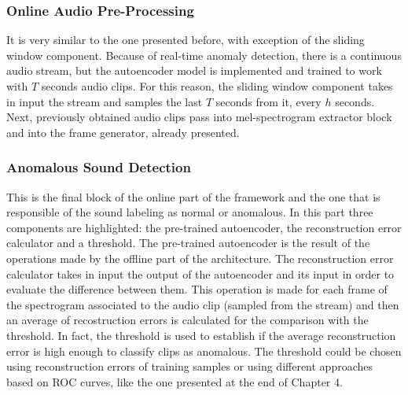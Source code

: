 \subsubsection{Online Audio Pre-Processing}
It is very similar to the one presented before, with exception of the sliding window component. Because of real-time anomaly detection, there is a continuous audio stream, but the autoencoder model is implemented and trained to work with $T$ seconds audio clips. For this reason, the sliding window component takes in input the stream and samples the last $T$ seconds from it, every $h$ seconds. Next, previously obtained audio clips pass into mel-spectrogram extractor block and into the frame generator, already presented. 
\subsubsection{Anomalous Sound Detection}
This is the final block of the online part of the framework and the one that is responsible of the sound labeling as normal or anomalous. In this part three components are highlighted: the pre-trained autoencoder, the reconstruction error calculator and a threshold. The pre-trained autoencoder is the result of the operations made by the offline part of the architecture. The reconstruction error calculator takes in input the output of the autoencoder and its input in order to evaluate the difference between them. This operation is made for each frame of the spectrogram associated to the audio clip (sampled from the stream) and then an average of recostruction errors is calculated for the comparison with the threshold. In fact, the threshold is used to establish if the average reconstruction error is high enough to classify clips as anomalous. The threshold could be chosen using reconstruction errors of training samples or using different approaches based on ROC curves, like the one presented at the end of Chapter 4.
